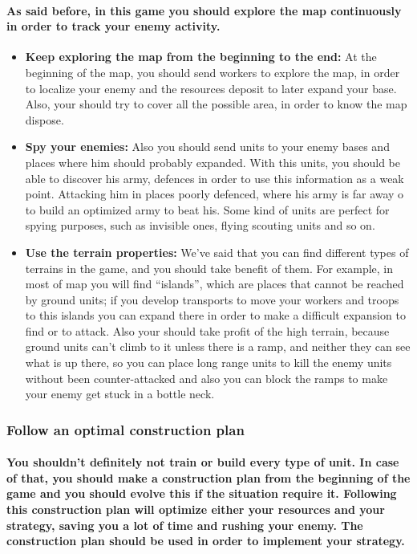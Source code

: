 \documentclass[a4paper,10pt]{article}
\newcommand{\p}[1]{\paragraph{\indent\textnormal{#1}}}
\begin{document}
    \p{As said before, in this game you should explore the map continuously in order to track your enemy activity.}

    \begin{itemize}
     \item \textbf{Keep exploring the map from the beginning to the end:} At the beginning of the map, you should send workers to explore the map, in order to localize your enemy and the resources deposit to later expand your base. Also, your should try to cover all the possible area, in order to know the map dispose.
     \item \textbf{Spy your enemies:} Also you should send units to your enemy bases and places where him should probably expanded. With this units, you should be able to discover his army, defences in order to use this information as a weak point. Attacking him in places poorly defenced, where his army is far away o to build an optimized army to beat his. Some kind of units are perfect for spying purposes, such as invisible ones, flying scouting units and so on.
     \item \textbf{Use the terrain properties:} We've said that you can find different types of terrains in the game, and you should take benefit of them. For example,  in most of map you will find ``islands'', which are places that cannot be reached by ground units; if you develop transports to move your workers and troops to this islands you can expand there in order to make a difficult expansion to find or to attack. Also your should take profit of the high terrain, because ground units can't climb to it unless there is a ramp, and neither they can see what is up there, so you can place long range units to kill the enemy units without been counter-attacked and also you can block the ramps to make your enemy get stuck in a bottle neck.
    \end{itemize}

  \subsubsection{Follow an optimal construction plan}
   
    \p{You shouldn't definitely not train or build every type of unit. In case of that, you should make a construction plan from the beginning of the game and you should evolve this if the situation require it. Following this construction plan will optimize either your resources and your strategy, saving you a lot of time and rushing your enemy. The construction plan should be used in order to implement your strategy.}
\end{document}
